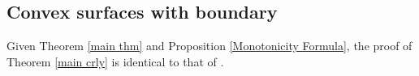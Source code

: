 \subsection{Convex surfaces with boundary}
Given Theorem \ref{main thm} and Proposition \ref{Monotonicity Formula}, the proof of Theorem \ref{main crly} is identical to that of \cite[Proposition 3.4]{górny2017planar}.



